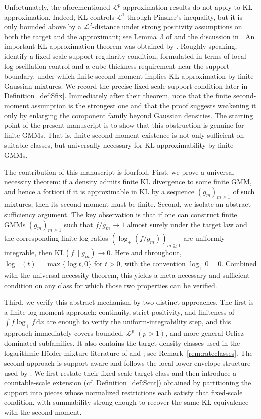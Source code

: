 \documentclass[11pt]{article}
\theoremstyle{definition}
\begin{document}
Unfortunately, the aforementioned $\mathcal L^p$ approximation results do not apply to KL approximation. Indeed, KL controls $\mathcal L^1$ through Pinsker's inequality, but it is only bounded above by a $\mathcal L^2$-distance under strong positivity assumptions on both the target and the approximant; see Lemma~3 of \citet{ZeeviMeir1997} and the discussion in \citet{NguyenMcLachlan2019}. An important KL approximation theorem was obtained by \citet[Theorem~3]{NoretsPelenis2012}. Roughly speaking, \cite{NoretsPelenis2012} identify a fixed-scale support-regularity condition, formulated in terms of local log-oscillation control and a cube-thickness requirement near the support boundary, under which finite second moment implies KL approximation by finite Gaussian mixtures. We record the precise fixed-scale support condition later in Definition~\ref{def:Sfix}. Immediately after their theorem, \cite{NoretsPelenis2012} note that the finite second-moment assumption is the strongest one and that the proof suggests weakening it only by enlarging the component family beyond Gaussian densities. The starting point of the present manuscript is to show that this obstruction is genuine for finite GMMs. That is, finite second-moment existence is not only sufficient on suitable classes, but universally necessary for KL approximability by finite GMMs.

The contribution of this manuscript is fourfold. First, we prove a universal necessity theorem: if a density admits finite KL divergence to some finite GMM, and hence a fortiori if it is approximable in KL by a sequence $(g_m)_{m\ge1}$ of such mixtures, then its second moment must be finite. Second, we isolate an abstract sufficiency argument. The key observation is that if one can construct finite GMMs $(g_m)_{m\ge1}$ such that $f/g_m\to1$ almost surely under the target law and the corresponding finite log-ratios $\left(\log_+(f/g_m)\right)_{m\ge1}$ are uniformly integrable, then $\mathrm{KL}(f\|g_m)\to0$. Here and throughout, $\log_+(t)=\max\{\log t,0\}$ for $t>0$, with the convention $\log_+0=0$. Combined with the universal necessity theorem, this yields a meta necessary and sufficient condition on any class for which those two properties can be verified.

Third, we verify this abstract mechanism by two distinct approaches. The first is a finite log-moment approach: continuity, strict positivity, and finiteness of $\int f\log_+ f\,\mathrm{d}x$ are enough to verify the uniform-integrability step, and this approach immediately covers bounded, $\mathcal L^p$ $(p>1)$, and more general Orlicz-dominated subfamilies. It also contains the target-density classes used in the logarithmic H\"older mixture literature of \citet{KruijerRousseauvdV2010} and \citet{MaugisRabusseauMichel2013}; see Remark~\ref{rem:rateclasses}. The second approach is support-aware and follows the local lower-envelope structure used by \citet{NoretsPelenis2012}. We first restate their fixed-scale target class and then introduce a countable-scale extension (cf. Definition~\ref{def:Scnt}) obtained by partitioning the support into pieces whose normalized restrictions each satisfy that fixed-scale condition, with summability strong enough to recover the same KL equivalence with the second moment.
\end{document}
